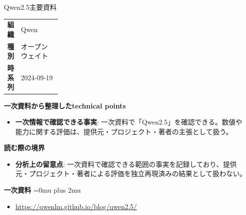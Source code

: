 \begin{technicalnote}{Qwen2.5}{主要資料}
\begingroup
\begin{tabularx}{\linewidth}{@{}>{\bfseries}p{0.22\linewidth}X@{}}
組織 & Qwen \\
種別 & オープンウェイト \\
時系列 & 2024-09-19 \\
\end{tabularx}
\smallskip
{\bfseries 一次資料から整理したtechnical points}
\begin{itemize}[leftmargin=1.5em,itemsep=0.35em]
\item \textbf{一次情報で確認できる事実}: 一次資料で「Qwen2.5」を確認できる。数値や能力に関する評価は、提供元・プロジェクト・著者の主張として扱う。
\end{itemize}
\begin{minipage}{\linewidth}
{\bfseries 読む際の境界}
\begin{itemize}[leftmargin=1.5em,itemsep=0.35em]
\item \textbf{分析上の留意点}: 一次資料で確認できる範囲の事実を記録しており、提供元・プロジェクト・著者による評価を独立再現済みの結果として扱わない。
\end{itemize}
\begin{samepage}
{\bfseries 一次資料}
\begingroup\sloppy
\Urlmuskip=0mu plus 2mu\relax
\begin{itemize}[leftmargin=1.5em,itemsep=0.25em]
\item {\scriptsize\url{https://qwenlm.github.io/blog/qwen2.5/}}
\end{itemize}
\endgroup
\end{samepage}
\end{minipage}
\endgroup
\end{technicalnote}
\medskip

